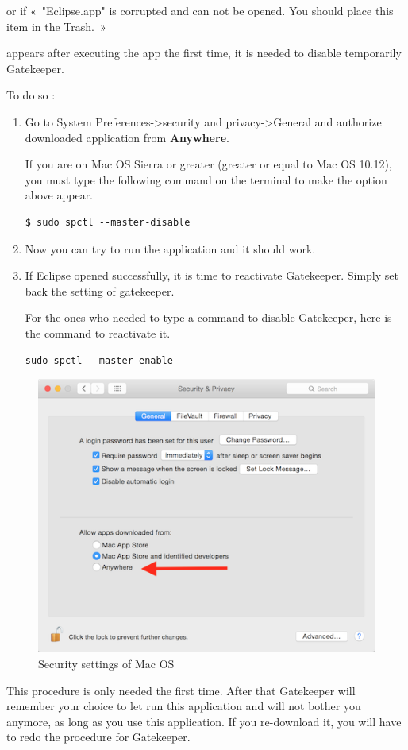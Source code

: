 \documentclass[a4paper]{article}
\begin{document}
or if « "Eclipse.app" is corrupted and can not be opened. You should place this item in the Trash. »

appears after executing the app the first time, it is needed to disable temporarily Gatekeeper.

To do so :
\begin{enumerate}
\item Go to System Preferences->security and privacy->General and authorize downloaded application from \textbf{Anywhere}.

If you are on Mac OS Sierra or greater (greater or equal to Mac OS 10.12), you must type the following command on the terminal to make the option above appear.
\begin{lstlisting}
$ sudo spctl --master-disable
\end{lstlisting}
\item Now you can try to run the application and it should work.
\item If Eclipse opened successfully, it is time to reactivate Gatekeeper. Simply set back the setting of gatekeeper.

For the ones who needed to type a command to disable Gatekeeper, here is the command to reactivate it.
\begin{lstlisting}
sudo spctl --master-enable
\end{lstlisting}
\end{enumerate}

\begin{figure}[!h]
\centering
\includegraphics[width=0.7\columnwidth]{fig/security_tab_mac}
\caption{Security settings of Mac OS}
\label{fig:security_tab_mac}
\end{figure}

This procedure is only needed the first time. After that Gatekeeper will remember your choice to let run this application and will not bother you anymore, as long as you use this application. If you re-download it, you will have to redo the procedure for Gatekeeper.
\end{document}
